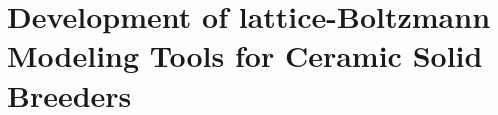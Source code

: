 \chapter{Development of lattice-Boltzmann Modeling Tools for Ceramic Solid Breeders}\label{sec:modeling-lbm}




